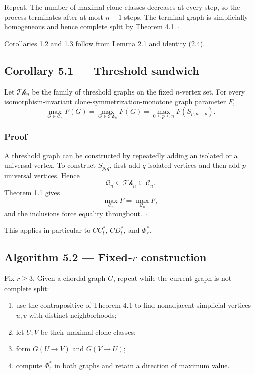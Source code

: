 \documentclass[11pt,a4paper]{article}
\providecommand{\tightlist}{\setlength{\itemsep}{0pt}\setlength{\parskip}{0pt}}
\begin{document}
Repeat. The number of maximal clone classes decreases at every step, so the
process terminates after at most \(n-1\) steps. The terminal graph is
simplicially homogeneous and hence complete split by Theorem 4.1.
\(\square\)

Corollaries 1.2 and 1.3 follow from Lemma 2.1 and identity (2.4).

\subsection{Corollary 5.1 --- Threshold sandwich}\label{corollary-5.1-threshold-sandwich}

Let \(\mathcal{Th}_n\) be the family of threshold graphs on the fixed
\(n\)-vertex set. For every isomorphism-invariant
clone-symmetrization-monotone graph parameter \(F\),
\[
\boxed{
\max_{G\in\mathcal C_n}F(G)
=
\max_{G\in\mathcal{Th}_n}F(G)
=
\max_{0\le p\le n}F(S_{p,n-p}).
}
\tag{5.1}
\]

\subsubsection{Proof}\label{proof-4}

A threshold graph can be constructed by repeatedly adding an isolated or a
universal vertex. To construct \(S_{p,q}\), first add \(q\) isolated
vertices and then add \(p\) universal vertices. Hence
\[
\mathcal Q_n\subseteq\mathcal{Th}_n\subseteq\mathcal C_n.
\]
Theorem 1.1 gives
\[
\max_{\mathcal C_n}F=\max_{\mathcal Q_n}F,
\]
and the inclusions force equality throughout.
\(\square\)

This applies in particular to \(CC_t^*\), \(CD_t^*\), and \(\Phi_r^*\).

\subsection{\texorpdfstring{Algorithm 5.2 --- Fixed-\(r\) construction}{Algorithm 5.2 --- Fixed-r construction}}\label{algorithm-5.2-fixed-r-construction}

Fix \(r\ge3\). Given a chordal graph \(G\), repeat while the current graph is
not complete split:

\begin{enumerate}
\def\labelenumi{\arabic{enumi}.}
\tightlist
\item
  use the contrapositive of Theorem 4.1 to find nonadjacent simplicial
  vertices \(u,v\) with distinct neighborhoods;
\item
  let \(U,V\) be their maximal clone classes;
\item
  form \(G(U\to V)\) and \(G(V\to U)\);
\item
  compute \(\Phi_r^*\) in both graphs and retain a direction of maximum
  value.
\end{enumerate}
\end{document}
